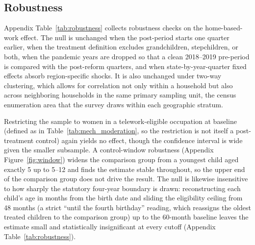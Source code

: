 \documentclass[12pt]{article}
\begin{document}


\subsection{Robustness}\label{sec:robustness}

Appendix Table~\ref{tab:robustness} collects robustness checks on the home-based-work effect. The null is unchanged when the post-period starts one quarter earlier, when the treatment definition excludes grandchildren, stepchildren, or both, when the pandemic years are dropped so that a clean 2018--2019 pre-period is compared with the post-reform quarters, and when state-by-year-quarter fixed effects absorb region-specific shocks. It is also unchanged under two-way clustering, which allows for correlation not only within a household but also across neighboring households in the same primary sampling unit, the census enumeration area that the survey draws within each geographic stratum.

Restricting the sample to women in a telework-eligible occupation at baseline (defined as in Table~\ref{tab:mech_moderation}, so the restriction is not itself a post-treatment control) again yields no effect, though the confidence interval is wide given the smaller subsample. A control-window robustness (Appendix Figure~\ref{fig:window}) widens the comparison group from a youngest child aged exactly 5 up to 5--12 and finds the estimate stable throughout, so the upper end of the comparison group does not drive the result. The null is likewise insensitive to how sharply the statutory four-year boundary is drawn: reconstructing each child's age in months from the birth date and sliding the eligibility ceiling from 48 months (a strict ``until the fourth birthday'' reading, which reassigns the oldest treated children to the comparison group) up to the 60-month baseline leaves the estimate small and statistically insignificant at every cutoff (Appendix Table~\ref{tab:robustness}).
\end{document}
